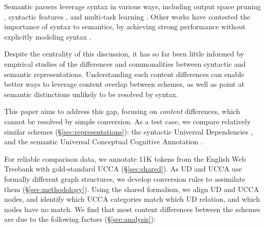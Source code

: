 \documentclass[11pt,a4paper]{article}
\begin{document}
  Semantic parsers leverage syntax in various ways,
  including output space pruning \cite{xue2004calibrating}, 
  syntactic features \cite{gildea2002automatic,N15-1007,E17-1045}, and
  multi-task learning \cite{swayamdipta2016greedy,swayamdipta2018syntactic,strubell2018linguistically}.
  Other works have contested the importance of syntax to semantics,
  by achieving strong performance without explicitly modeling syntax \cite{Peng-EtAl:2018:NAACL,P18-2077,P18-1192,C18-1233}.
  

  Despite the centrality of this discussion, it has so far been little informed by empirical studies of
  the differences and commonalities between syntactic and semantic representations.
  Understanding such content differences can enable better ways to leverage content overlap between schemes, 
  as well as point at semantic distinctions unlikely to be resolved by syntax.

  This paper aims to address this gap,
  focusing on {\it content} differences, which cannot be resolved by simple
  conversion.
  As a test case, we compare relatively similar schemes (\S\ref{sec:representations}):
  the syntactic Universal Dependencies \cite[UD; ][]{nivre2016universal},
  and the semantic Universal Conceptual Cognitive Annotation \cite[UCCA; ][]{abend2013universal}.

  For reliable comparison data,
  we annotate 11K tokens from the English Web Treebank with gold-standard UCCA (\S\ref{sec:shared}).
  As UD and UCCA use formally different graph structures,
  we develop conversion rules to assimilate them
   (\S\ref{sec:methodology}).
  Using the shared formalism, we align UD and UCCA nodes,
  and identify which UCCA categories match which UD relation,
  and which nodes have no match.
   We find that most content differences between the schemes are due to the following
   factors (\S\ref{sec:analysis}):
\end{document}
